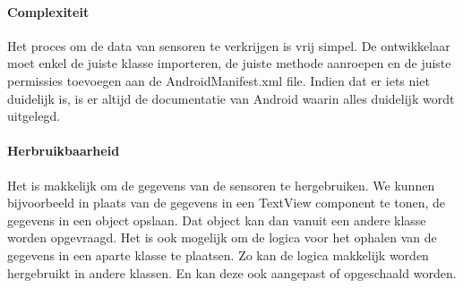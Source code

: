 \paragraph{Complexiteit}
Het proces om de data van sensoren te verkrijgen is vrij simpel. De ontwikkelaar moet enkel de juiste klasse importeren, 
de juiste methode aanroepen en de juiste permissies toevoegen aan de AndroidManifest.xml file. Indien dat er iets niet 
duidelijk is, is er altijd de documentatie van Android waarin alles duidelijk wordt uitgelegd.

\paragraph{Herbruikbaarheid}
Het is makkelijk om de gegevens van de sensoren te hergebruiken. We kunnen bijvoorbeeld in plaats van de 
gegevens in een TextView component te tonen, de gegevens in een object opslaan. Dat object kan dan vanuit 
een andere klasse worden opgevraagd. Het is ook mogelijk om de logica voor het ophalen van de gegevens
in een aparte klasse te plaatsen. Zo kan de logica makkelijk worden hergebruikt in andere klassen. 
En kan deze ook aangepast of opgeschaald worden.
